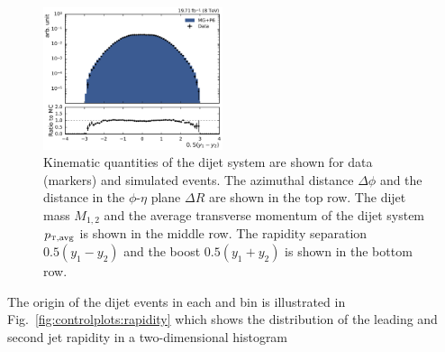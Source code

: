 \begin{figure}[htbp]
    \includegraphics[width=0.47\textwidth]{figures/measurement/dijet_quantities_dijet_ystar.pdf}
    \caption[Kinematic quantities of the dijet system]{Kinematic quantities of
    the dijet system are shown for data (markers) and simulated events. The
    azimuthal distance $\Delta\phi$ and the distance in the $\phi$-$\eta$ plane
    $\Delta R$ are shown in the top row. The dijet mass $M_{1,2}$ and the average
    transverse momentum of the dijet system $\ptavg$ is shown in the middle row. The
    rapidity separation $0.5(y_1 - y_2)$ and the boost $0.5(y_1+y_2)$ is shown in
    the bottom row.}
    \label{fig:controlplots:dijets}
\end{figure}

The origin of the dijet events in each \ystar and \yboost bin is illustrated in
Fig.~\ref{fig:controlplots:rapidity} which shows the distribution of the leading
and second jet rapidity in a two-dimensional histogram

